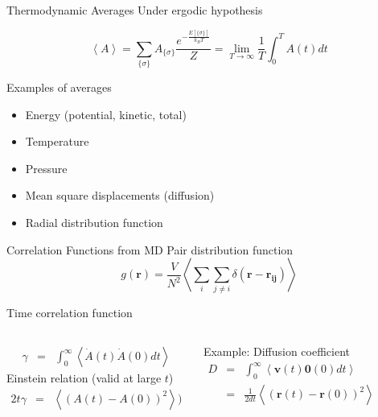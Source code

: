 \documentclass[aspectratio=169]{beamer}
\let \vec \mathbf
\begin{document}
\begin{frame}{Thermodynamic Averages}
Under ergodic hypothesis

\begin{equation*}
\left< A \right> = \sum_{\{\sigma\}} A_{\{\sigma\}} \frac{e^{-\frac{E[\{\sigma\}]}{k_BT}}}{Z} = \lim_{T\rightarrow \infty} \frac{1}{T} \int_0^T A(t) dt
\end{equation*} 

Examples of averages
\begin{itemize}
    \item Energy (potential, kinetic, total)
    \item Temperature
    \item Pressure
    \item Mean square displacements (diffusion)
    \item Radial distribution function
\end{itemize}
\end{frame} 

\begin{frame}{Correlation Functions from MD}
Pair distribution function
\begin{equation*}
g(\vec{r}) = \frac{V}{N^2} \left< \sum_i \sum_{j \neq i} \delta(\vec{r} - \vec{r_{ij}}) \right>
\end{equation*} 

Time correlation function

\begin{columns}
\begin{eqnarray*}
\gamma & =  & \int_0^{\infty} \left< \dot{A}(t) \dot{A}(0) dt \right>
\end{eqnarray*} 
Einstein relation (valid at large $t$)
\begin{eqnarray*}
2t \gamma & =  & \left< (A(t) - A(0))^2 \right> \mathrm{)}
\end{eqnarray*} 

Example: Diffusion coefficient
\begin{eqnarray*}
D & =  & \int_0^{\infty} \left< \vec{v}(t) \vec{0}(0) dt \right> \\
& =  & \frac{1}{2dt} \left< (\vec{r}(t) - \vec{r}(0))^2 \right>
\end{eqnarray*} 

\end{columns} 

\end{frame} 
\end{document}
